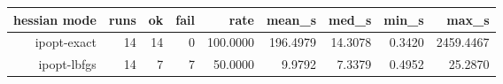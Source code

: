 {\footnotesize
\begin{longtable}{|r|r|r|r|r|r|r|r|r|}
  \hline
  \textbf{hessian mode} & \textbf{runs} & \textbf{ok} & \textbf{fail} & \textbf{rate} & \textbf{mean\_s} & \textbf{med\_s} & \textbf{min\_s} & \textbf{max\_s} \\
  \hline
  ipopt-exact & 14 & 14 & 0 & 100.0000 & 196.4979 & 14.3078 & 0.3420 & 2459.4467 \\
  ipopt-lbfgs & 14 & 7 & 7 & 50.0000 & 9.9792 & 7.3379 & 0.4952 & 25.2870 \\
  \hline
\end{longtable}
}
